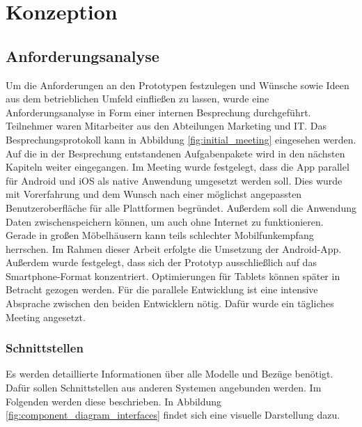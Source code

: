 

\section{Konzeption}

\subsection{Anforderungsanalyse}
Um die Anforderungen an den Prototypen festzulegen und Wünsche sowie Ideen aus dem betrieblichen Umfeld einfließen zu lassen, wurde eine Anforderungsanalyse in Form einer internen Besprechung durchgeführt. Teilnehmer waren Mitarbeiter aus den Abteilungen Marketing und IT. Das Besprechungsprotokoll kann in Abbildung \ref{fig:initial_meeting} eingesehen werden. Auf die in der Besprechung entstandenen Aufgabenpakete wird in den nächsten Kapiteln weiter eingegangen. Im Meeting wurde festgelegt, dass die App parallel für Android und iOS als native Anwendung umgesetzt werden soll. Dies wurde mit Vorerfahrung und dem Wunsch nach einer möglichst angepassten Benutzeroberfläche für alle Plattformen begründet. Außerdem soll die Anwendung Daten zwischenspeichern können, um auch ohne Internet zu funktionieren. Gerade in großen Möbelhäusern kann teils schlechter Mobilfunkempfang herrschen. Im Rahmen dieser Arbeit erfolgte die Umsetzung der Android-App. Außerdem wurde festgelegt, dass sich der Prototyp ausschließlich auf das Smartphone-Format konzentriert. Optimierungen für Tablets können später in Betracht gezogen werden. Für die parallele Entwicklung ist eine intensive Absprache zwischen den beiden Entwicklern nötig. Dafür wurde ein tägliches Meeting angesetzt.

\subsubsection{Schnittstellen}
\label{sec:schnittstellen}
Es werden detaillierte Informationen über alle Modelle und Bezüge benötigt. Dafür sollen Schnittstellen aus anderen Systemen angebunden werden. Im Folgenden werden diese beschrieben. In Abbildung \ref{fig:component_diagram_interfaces} findet sich eine visuelle Darstellung dazu.

